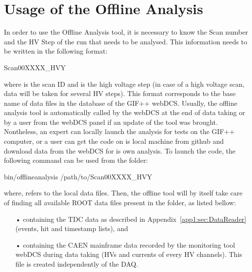 \section{Usage of the Offline Analysis}
\label{app2:sec:usage}

	In order to use the Offline Analysis tool, it is necessary to know the Scan number and the HV Step of the run that needs to be analysed. This information needs to be written in the following format:\\
	
	\begin{bashcode}
 Scan00XXXX_HVY
	\end{bashcode}
\vspace{5mm}
	where  is the scan ID and  is the high voltage step (in case of a high voltage scan, data will be taken for several HV steps). This format corresponds to the base name of data files in the database of the GIF++ webDCS. Usually, the offline analysis tool is automatically called by the webDCS at the end of data taking or by a user from the webDCS panel if an update of the tool was brought. Nontheless, an expert can locally launch the analysis for tests on the GIF++ computer, or a user can get the code on is local machine from github and download data from the webDCS for is own analysis. To launch the code, the following command can be used from the  folder:\\
	
	\begin{bashcode}
 bin/offlineanalysis /path/to/Scan00XXXX_HVY
	\end{bashcode}
\vspace{5mm}
	where,  refers to the local data files. Then, the offline tool will by itself take care of finding all available ROOT data files present in the folder, as listed bellow:

	\begin{itemize}
		\item[•]  containing the TDC data as described in Appendix~\ref{app1:sec:DataReader} (events, hit and timestamp lists), and
		\item[•]  containing the CAEN mainframe data recorded by the monitoring tool webDCS during data taking (HVs and currents of every HV channels). This file is created independently of the DAQ.
	\end{itemize}
	
